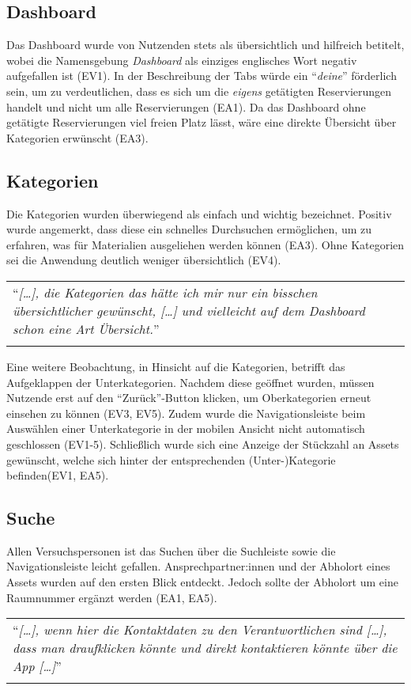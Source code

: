 \subsection{Dashboard}
Das Dashboard wurde von Nutzenden stets als übersichtlich und hilfreich
betitelt, wobei die Namensgebung \textit{Dashboard} als einziges englisches
Wort negativ aufgefallen ist (EV1). In der Beschreibung der Tabs würde ein
\enquote{\textit{deine}} förderlich sein, um zu verdeutlichen, dass es sich um die \textit{eigens}
getätigten Reservierungen handelt und nicht um alle Reservierungen (EA1). Da
das Dashboard ohne getätigte Reservierungen viel freien Platz lässt, wäre eine
direkte Übersicht über Kategorien erwünscht (EA3). 

\subsection{Kategorien}
Die Kategorien wurden überwiegend als einfach und wichtig bezeichnet. Positiv wurde angemerkt, dass
diese ein schnelles Durchsuchen ermöglichen, um zu erfahren, was für Materialien ausgeliehen werden
können (EA3). Ohne Kategorien sei die Anwendung deutlich weniger übersichtlich (EV4).

\begin{longtable}{p{}} \arrayrulecolor{maincolor}\hline
  \enquote{\textit{[\dots], die Kategorien das hätte ich mir nur ein bisschen
      übersichtlicher gewünscht, [\dots] und vielleicht auf dem Dashboard schon eine
  Art Übersicht.}} \\
  \arrayrulecolor{maincolor}\hline
\end{longtable}

Eine weitere Beobachtung, in Hinsicht auf die Kategorien, betrifft das Aufgeklappen der
Unterkategorien. Nachdem diese geöffnet wurden, müssen Nutzende erst auf den \enquote{Zurück}-Button
klicken, um Oberkategorien erneut einsehen zu können (EV3, EV5). Zudem wurde die Navigationsleiste
beim Auswählen einer Unterkategorie in der mobilen Ansicht nicht automatisch geschlossen (EV1-5).
Schließlich wurde sich eine Anzeige der Stückzahl an Assets gewünscht, welche sich hinter der
entsprechenden (Unter-)Kategorie befinden(EV1, EA5).

\subsection{Suche}
Allen Versuchspersonen ist das Suchen über die Suchleiste sowie die Navigationsleiste leicht
gefallen. Ansprechpartner:innen und der Abholort eines Assets wurden auf den ersten Blick entdeckt.
Jedoch sollte der Abholort um eine Raumnummer ergänzt werden (EA1, EA5).
\begin{longtable}{p{}} \arrayrulecolor{maincolor}\hline
  \enquote{\textit{[\dots], wenn hier die Kontaktdaten zu den Verantwortlichen
      sind [\dots], dass man draufklicken könnte und direkt kontaktieren könnte
  über die App [\dots]}} \\
  \arrayrulecolor{maincolor}\hline
\end{longtable}

